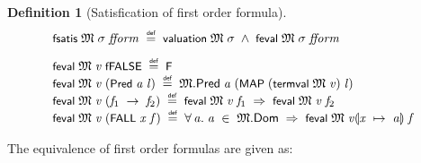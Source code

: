 \documentclass[letterpaper]{article}
\newtheorem{defn}{Definition}
\renewcommand{\HOLConst}[1]{{\textsf{\upshape\small #1}}}
\newenvironment{holmath}{\begin{displaymath}\begin{array}{l}}{\end{array}\end{displaymath}\ignorespacesafterend}
\begin{document}
\begin{defn}[Satisfication of first order formula]
\begin{holmath}
  \HOLConst{fsatis}\;\HOLFreeVar{\ensuremath{\mathfrak{M}}}\;\HOLFreeVar{\ensuremath{\sigma}}\;\HOLFreeVar{fform}\;\HOLSymConst{\HOLTokenDefEquality{}}\;\HOLConst{valuation}\;\HOLFreeVar{\ensuremath{\mathfrak{M}}}\;\HOLFreeVar{\ensuremath{\sigma}}\;\HOLSymConst{\HOLTokenConj{}}\;\HOLConst{feval}\;\HOLFreeVar{\ensuremath{\mathfrak{M}}}\;\HOLFreeVar{\ensuremath{\sigma}}\;\HOLFreeVar{fform}\\[3mm]
  \HOLConst{feval}\;\HOLFreeVar{\ensuremath{\mathfrak{M}}}\;\HOLFreeVar{v}\;\HOLConst{fFALSE}\;\HOLSymConst{\HOLTokenDefEquality{}}\;\HOLConst{F}\\
\HOLConst{feval}\;\HOLFreeVar{\ensuremath{\mathfrak{M}}}\;\HOLFreeVar{v}\;(\HOLConst{Pred}\;\HOLFreeVar{a}\;\HOLFreeVar{l})\;\HOLSymConst{\HOLTokenDefEquality{}}\;\HOLFreeVar{\ensuremath{\mathfrak{M}}}.\HOLFieldName{Pred}\;\HOLFreeVar{a}\;(\HOLConst{MAP}\;(\HOLConst{termval}\;\HOLFreeVar{\ensuremath{\mathfrak{M}}}\;\HOLFreeVar{v})\;\HOLFreeVar{l})\\
\HOLConst{feval}\;\HOLFreeVar{\ensuremath{\mathfrak{M}}}\;\HOLFreeVar{v}\;(\HOLFreeVar{f\sb{\mathrm{1}}}\;\HOLSymConst{\ensuremath{\rightarrow}}\;\HOLFreeVar{f\sb{\mathrm{2}}})\;\HOLSymConst{\HOLTokenDefEquality{}}\;\HOLConst{feval}\;\HOLFreeVar{\ensuremath{\mathfrak{M}}}\;\HOLFreeVar{v}\;\HOLFreeVar{f\sb{\mathrm{1}}}\;\HOLSymConst{\HOLTokenImp{}}\;\HOLConst{feval}\;\HOLFreeVar{\ensuremath{\mathfrak{M}}}\;\HOLFreeVar{v}\;\HOLFreeVar{f\sb{\mathrm{2}}}\\
\HOLConst{feval}\;\HOLFreeVar{\ensuremath{\mathfrak{M}}}\;\HOLFreeVar{v}\;(\HOLConst{FALL}\;\HOLFreeVar{x}\;\HOLFreeVar{f})\;\HOLSymConst{\HOLTokenDefEquality{}}\;\HOLSymConst{\HOLTokenForall{}}\HOLBoundVar{a}.\;\HOLBoundVar{a}\;\HOLSymConst{\HOLTokenIn{}}\;\HOLFreeVar{\ensuremath{\mathfrak{M}}}.\HOLFieldName{Dom}\;\HOLSymConst{\HOLTokenImp{}}\;\HOLConst{feval}\;\HOLFreeVar{\ensuremath{\mathfrak{M}}}\;\HOLFreeVar{v}\ensuremath{\llparenthesis}\HOLFreeVar{x}\;\ensuremath{\mapsto}\;\HOLBoundVar{a}\ensuremath{\rrparenthesis}\;\HOLFreeVar{f}\\
\end{holmath}
\end{defn}

The equivalence of first order formulas are given as:
\end{document}
